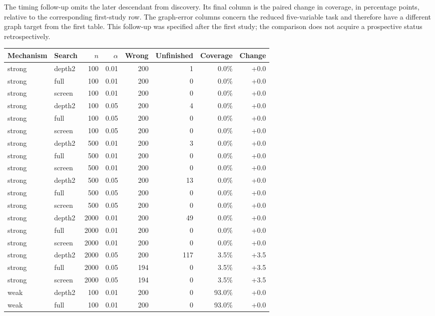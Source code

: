 The timing follow-up omits the later descendant from discovery. Its final
column is the paired change in coverage, in percentage points, relative to
the corresponding first-study row. The graph-error columns concern the reduced
five-variable task and therefore have a different graph target from the first
table. This follow-up was specified after the first study; the comparison
does not acquire a prospective status retrospectively.

\begingroup\small
\begin{longtable}{llrrrrrr}
\toprule
Mechanism & Search & $n$ & $\alpha$ & Wrong & Unfinished & Coverage & Change\\
\midrule\endhead
strong & depth2 & 100 & 0.01 & 200 & 1 & 0.0\% & +0.0\\
strong & full & 100 & 0.01 & 200 & 0 & 0.0\% & +0.0\\
strong & screen & 100 & 0.01 & 200 & 0 & 0.0\% & +0.0\\
strong & depth2 & 100 & 0.05 & 200 & 4 & 0.0\% & +0.0\\
strong & full & 100 & 0.05 & 200 & 0 & 0.0\% & +0.0\\
strong & screen & 100 & 0.05 & 200 & 0 & 0.0\% & +0.0\\
strong & depth2 & 500 & 0.01 & 200 & 3 & 0.0\% & +0.0\\
strong & full & 500 & 0.01 & 200 & 0 & 0.0\% & +0.0\\
strong & screen & 500 & 0.01 & 200 & 0 & 0.0\% & +0.0\\
strong & depth2 & 500 & 0.05 & 200 & 13 & 0.0\% & +0.0\\
strong & full & 500 & 0.05 & 200 & 0 & 0.0\% & +0.0\\
strong & screen & 500 & 0.05 & 200 & 0 & 0.0\% & +0.0\\
strong & depth2 & 2000 & 0.01 & 200 & 49 & 0.0\% & +0.0\\
strong & full & 2000 & 0.01 & 200 & 0 & 0.0\% & +0.0\\
strong & screen & 2000 & 0.01 & 200 & 0 & 0.0\% & +0.0\\
strong & depth2 & 2000 & 0.05 & 200 & 117 & 3.5\% & +3.5\\
strong & full & 2000 & 0.05 & 194 & 0 & 3.5\% & +3.5\\
strong & screen & 2000 & 0.05 & 194 & 0 & 3.5\% & +3.5\\
weak & depth2 & 100 & 0.01 & 200 & 0 & 93.0\% & +0.0\\
weak & full & 100 & 0.01 & 200 & 0 & 93.0\% & +0.0\\

\end{longtable}
